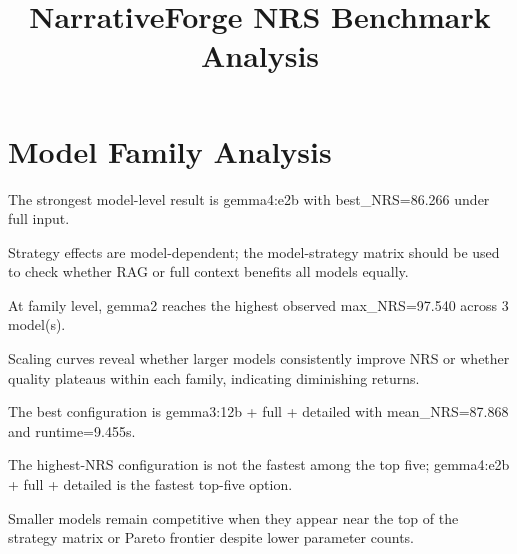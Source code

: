 \documentclass{article}
\begin{document}
\title{NarrativeForge NRS Benchmark Analysis}
\maketitle
\section{Model Family Analysis}
The strongest model-level result is gemma4:e2b with best\_NRS=86.266 under full input.


Strategy effects are model-dependent; the model-strategy matrix should be used to check whether RAG or full context benefits all models equally.


At family level, gemma2 reaches the highest observed max\_NRS=97.540 across 3 model(s).


Scaling curves reveal whether larger models consistently improve NRS or whether quality plateaus within each family, indicating diminishing returns.


The best configuration is gemma3:12b + full + detailed with mean\_NRS=87.868 and runtime=9.455s.


The highest-NRS configuration is not the fastest among the top five; gemma4:e2b + full + detailed is the fastest top-five option.


Smaller models remain competitive when they appear near the top of the strategy matrix or Pareto frontier despite lower parameter counts.
\end{document}
